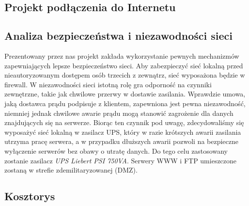 \documentclass[a4paper, 12pt]{article}
\begin{document}
\subsection{Projekt podłączenia do Internetu}

\subsection{Analiza bezpieczeństwa i niezawodności sieci}
Prezentowany przez nas projekt zakłada wykorzystanie pewnych mechanizmów zapewniających lepsze bezpieczeństwo sieci. Aby zabezpieczyć sieć lokalną przed nieautoryzowanym dostępem osób trzecich z zewnątrz, sieć wyposażona będzie w firewall. W niezawodności sieci istotną rolę gra odporność na czynniki zewnętrzne, takie jak chwilowe przerwy w dostawie zasilania. Wprawdzie umowa, jaką dostawca prądu podpisuje z klientem, zapewniona jest pewna niezawodność, niemniej jednak chwilowe awarie prądu mogą stanowić zagrożenie dla danych znajdujących się na serwerze. Biorąc ten czynnik pod uwagę, zdecydowaliśmy się wyposażyć sieć lokalną w zasilacz UPS, który w razie krótszych awarii zasilania utrzyma pracę serwera, a w przypadku dłuższych awarii pozwoli na bezpieczne wyłączenie serwerów bez obawy o utratę danych. Do tego celu zastosowany zostanie zasilacz \textit{UPS Liebert PSI 750VA}.%
Serwery WWW i FTP umieszczone zostaną w strefie zdemilitaryzowanej (DMZ).

\subsection{Kosztorys}
\end{document}
